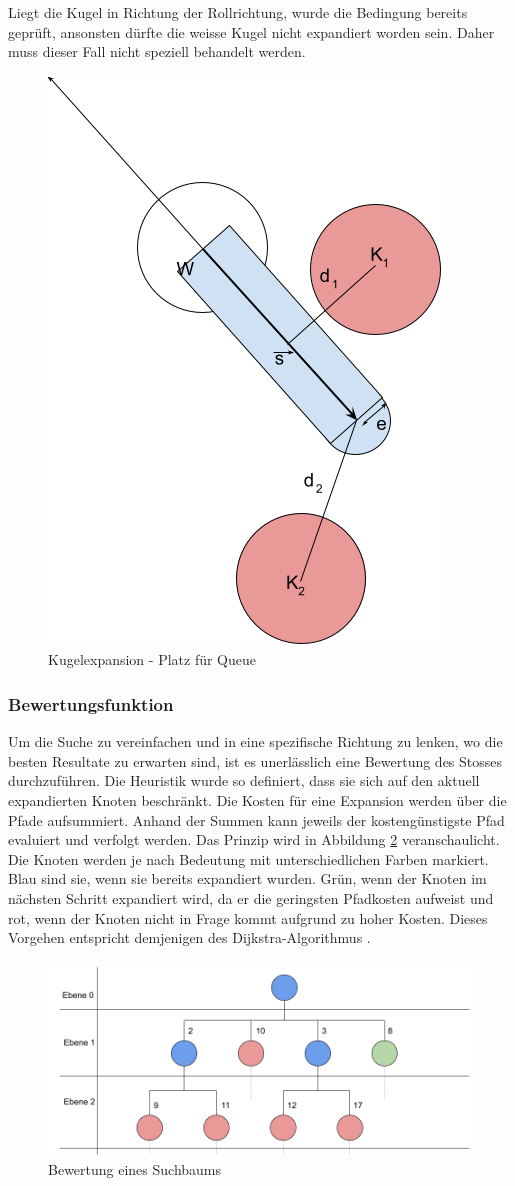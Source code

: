 Liegt die Kugel in Richtung der Rollrichtung, wurde die Bedingung bereits geprüft, ansonsten dürfte die weisse Kugel nicht
expandiert worden sein. Daher muss dieser Fall nicht speziell behandelt werden.

\begin{figure}[h!]
    \begin{center}
        \includegraphics[width=0.3\linewidth]{../common/03_billiard_ai/resources/37_platz_fuer_queue.png}
    \end{center}
    \caption{Kugelexpansion - Platz für Queue}
    \label{fig:kugelexpansion_platz_fuer_queue}
\end{figure}

\newpage
\subsubsection{Bewertungsfunktion}
Um die Suche zu vereinfachen und in eine spezifische Richtung zu lenken, wo die besten Resultate zu erwarten sind, ist
es unerlässlich eine Bewertung des Stosses durchzuführen. Die Heuristik wurde so definiert, dass sie sich auf den
aktuell expandierten Knoten beschränkt. Die Kosten für eine Expansion werden über die Pfade aufsummiert. Anhand der
Summen kann jeweils der kostengünstigste Pfad evaluiert und verfolgt werden.
Das Prinzip wird in Abbildung \ref{fig:suchbaum_bewertung} veranschaulicht. Die Knoten werden je nach Bedeutung mit
unterschiedlichen Farben markiert. Blau sind sie, wenn sie bereits expandiert wurden. Grün, wenn der Knoten im nächsten
Schritt expandiert wird, da er die geringsten Pfadkosten aufweist und rot, wenn der Knoten nicht in Frage kommt aufgrund
zu hoher Kosten. Dieses Vorgehen entspricht demjenigen des Dijkstra-Algorithmus \cite{wiki.dijkstra:1}.
\begin{figure}[h!]
    \begin{center}
        \includegraphics[width=0.8\linewidth]{../common/03_billiard_ai/resources/28_suchbaum_bewertung.png}
    \end{center}
    \caption{Bewertung eines Suchbaums}
    \label{fig:suchbaum_bewertung}
\end{figure}

